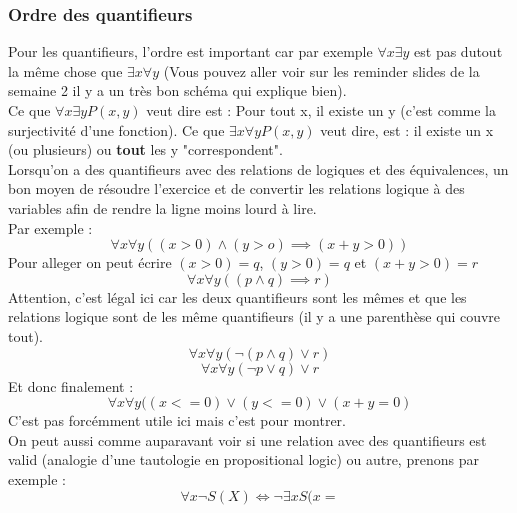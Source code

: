 \subsubsection{Ordre des quantifieurs}
Pour les quantifieurs, l'ordre est important car par exemple $\forall x \exists y$ est pas dutout la même chose que $\exists x \forall y$ (Vous pouvez aller voir sur les reminder slides de la semaine 2 il y a un très bon schéma qui explique bien).
\\
Ce que $\forall x \exists y P(x, y)$ veut dire est : Pour tout x, il existe un y (c'est comme la surjectivité d'une fonction). Ce que $\exists x \forall y P(x, y)$ veut dire, est : il existe un x (ou plusieurs) ou \textbf{tout} les y "correspondent".
\\
Lorsqu'on a des quantifieurs avec des relations de logiques et des équivalences, un bon moyen de résoudre l'exercice et de convertir les relations logique à des variables afin de rendre la ligne moins lourd à lire.
\\
Par exemple :
\begin{equation*}
    \forall x \forall y ((x > 0) \wedge (y > o) \implies (x + y > 0))
\end{equation*}
Pour alleger on peut écrire $(x > 0) = q$, $(y > 0) = q$ et $(x + y > 0) = r$
\begin{equation*}
    \forall x \forall y ((p \wedge q) \implies r)
\end{equation*}
Attention, c'est légal ici car les deux quantifieurs sont les mêmes et que les relations logique sont de les même quantifieurs (il y a une parenthèse qui couvre tout).
\begin{equation*}
    \forall x \forall y (\neg(p\wedge q) \vee r)
\end{equation*}
\begin{equation*}
    \forall x \forall y (\neg p \vee q) \vee r
\end{equation*}
Et donc finalement :
\begin{equation*}
    \forall x \forall y ((x <= 0) \vee (y <= 0) \vee (x+y = 0)
\end{equation*}
C'est pas forcémment utile ici mais c'est pour montrer.
\\
On peut aussi comme auparavant voir si une relation avec des quantifieurs est valid (analogie d'une tautologie en propositional logic) ou autre, prenons par exemple : 
\begin{equation*}
    \forall x \neg S(X) \iff \neg\exists x S(x=
\end{equation*}
